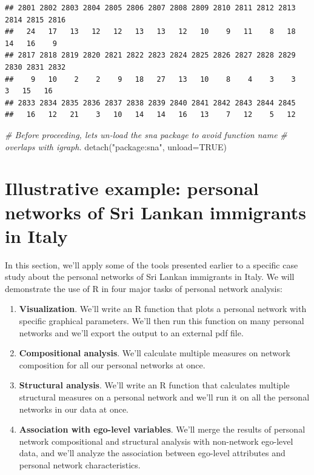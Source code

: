 \documentclass[
]{book}
\newenvironment{Shaded}{\begin{snugshade}}{\end{snugshade}}
\newcommand{\AttributeTok}[1]{\textcolor[rgb]{0.77,0.63,0.00}{#1}}
\newcommand{\CommentTok}[1]{\textcolor[rgb]{0.56,0.35,0.01}{\textit{#1}}}
\newcommand{\ConstantTok}[1]{\textcolor[rgb]{0.00,0.00,0.00}{#1}}
\newcommand{\FunctionTok}[1]{\textcolor[rgb]{0.00,0.00,0.00}{#1}}
\newcommand{\NormalTok}[1]{#1}
\newcommand{\StringTok}[1]{\textcolor[rgb]{0.31,0.60,0.02}{#1}}
\begin{document}
\begin{verbatim}
## 2801 2802 2803 2804 2805 2806 2807 2808 2809 2810 2811 2812 2813 2814 2815 2816 
##   24   17   13   12   12   13   13   12   10    9   11    8   18   14   16    9 
## 2817 2818 2819 2820 2821 2822 2823 2824 2825 2826 2827 2828 2829 2830 2831 2832 
##    9   10    2    2    9   18   27   13   10    8    4    3    3    3   15   16 
## 2833 2834 2835 2836 2837 2838 2839 2840 2841 2842 2843 2844 2845 
##   16   12   21    3   10   14   14   16   13    7   12    5   12
\end{verbatim}

\begin{Shaded}
\begin{Highlighting}[]
\CommentTok{\# Before proceeding, let\textquotesingle{}s un{-}load the sna package to avoid function name }
\CommentTok{\# overlaps with igraph.}
\FunctionTok{detach}\NormalTok{(}\StringTok{"package:sna"}\NormalTok{, }\AttributeTok{unload=}\ConstantTok{TRUE}\NormalTok{)}
\end{Highlighting}
\end{Shaded}

\hypertarget{illustrative-example-personal-networks-of-sri-lankan-immigrants-in-italy}{%
\section{Illustrative example: personal networks of Sri Lankan immigrants in Italy}\label{illustrative-example-personal-networks-of-sri-lankan-immigrants-in-italy}}

In this section, we'll apply some of the tools presented earlier to a specific case study about the personal networks of Sri Lankan immigrants in Italy. We will demonstrate the use of R in four major tasks of personal network analysis:

\begin{enumerate}
\def\labelenumi{\arabic{enumi}.}
\item
  \textbf{Visualization}. We'll write an R function that plots a personal network with specific graphical parameters. We'll then run this function on many personal networks and we'll export the output to an external pdf file.
\item
  \textbf{Compositional analysis}. We'll calculate multiple measures on network composition for all our personal networks at once.
\item
  \textbf{Structural analysis}. We'll write an R function that calculates multiple structural measures on a personal network and we'll run it on all the personal networks in our data at once.
\item
  \textbf{Association with ego-level variables}. We'll merge the results of personal network compositional and structural analysis with non-network ego-level data, and we'll analyze the association between ego-level attributes and personal network characteristics.
\end{enumerate}
\end{document}
